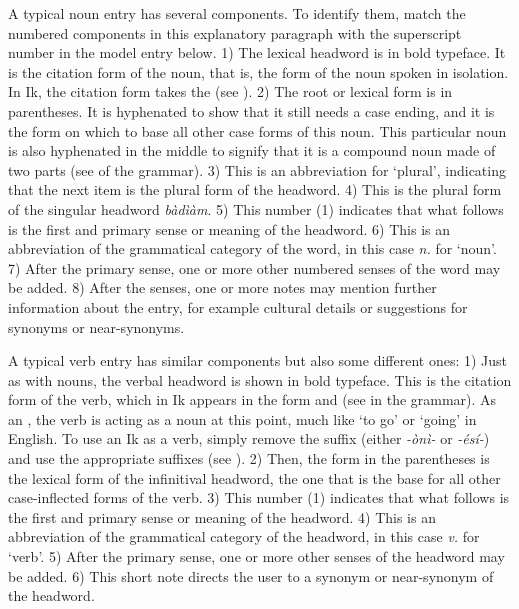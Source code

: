 A typical noun entry has several components. To identify them, match the numbered components in this explanatory paragraph with the superscript number in the model entry below. 1) The lexical headword is in bold typeface. It is the citation form of the noun, that is, the form of the noun spoken in isolation. In Ik, the citation form takes the  (see ). 2) The root or lexical form is in parentheses. It is hyphenated to show that it still needs a case ending, and it is the form on which to base all other case forms of this noun. This particular noun is also hyphenated in the middle to signify that it is a compound noun made of two parts (see  of the grammar). 3) This is an abbreviation for ‘plural’, indicating that the next item is the plural form of the headword. 4) This is the plural form of the singular headword \textit{bàdìàm}. 5) This number (1) indicates that what follows is the first and primary sense or meaning of the headword. 6) This is an abbreviation of the grammatical category of the word, in this case \textit{n.} for ‘noun’. 7) After the primary sense, one or more other numbered senses of the word may be added. 8) After the senses, one or more notes may mention further information about the entry, for example cultural details or suggestions for synonyms or near-synonyms.


A typical verb entry has similar components but also some different ones: 1) Just as with nouns, the verbal headword is shown in bold typeface. This is the citation form of the verb, which in Ik appears in the  form and  (see  in the grammar). As an , the verb is acting as a noun at this point, much like ‘to go’ or ‘going’ in English. To use an Ik  as a verb, simply remove the  suffix (either \textit{-ònì- }or \textit{-ésí-}) and use the appropriate suffixes (see ). 2) Then, the form in the parentheses is the lexical form of the infinitival headword, the one that is the base for all other case-inflected forms of the verb. 3) This number (1) indicates that what follows is the first and primary sense or meaning of the headword. 4) This is an abbreviation of the grammatical category of the headword, in this case \textit{v. }for ‘verb’. 5) After the primary sense, one or more other senses of the headword may be added. 6) This short note directs the user to a synonym or near-synonym of the headword.

